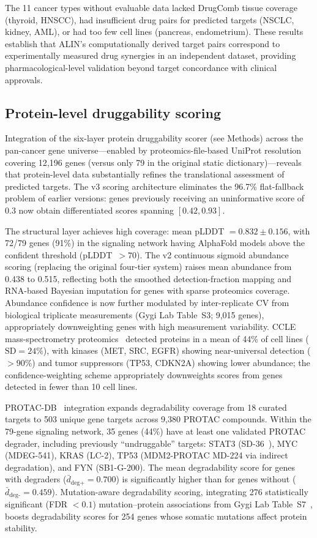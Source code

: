 \documentclass[times, twoside, watermark]{zHenriquesLab-StyleBioRxiv}
\begin{document}
The 11 cancer types without evaluable data lacked DrugComb tissue coverage (thyroid, HNSCC), had insufficient drug pairs for predicted targets (NSCLC, kidney, AML), or had too few cell lines (pancreas, endometrium). These results establish that ALIN's computationally derived target pairs correspond to experimentally measured drug synergies in an independent dataset, providing pharmacological-level validation beyond target concordance with clinical approvals.

\subsection*{Protein-level druggability scoring}
Integration of the six-layer protein druggability scorer (see Methods) across the pan-cancer gene universe---enabled by proteomics-file-based UniProt resolution covering 12{,}196 genes (versus only 79 in the original static dictionary)---reveals that protein-level data substantially refines the translational assessment of predicted targets. The v3 scoring architecture eliminates the 96.7\% flat-fallback problem of earlier versions: genes previously receiving an uninformative score of 0.3 now obtain differentiated scores spanning $[0.42, 0.93]$.

The structural layer achieves high coverage: mean pLDDT $= 0.832 \pm 0.156$, with 72/79 genes (91\%) in the signaling network having AlphaFold models above the confident threshold (pLDDT~$> 70$). The v2 continuous sigmoid abundance scoring (replacing the original four-tier system) raises mean abundance from 0.438 to 0.515, reflecting both the smoothed detection-fraction mapping and RNA-based Bayesian imputation for genes with sparse proteomics coverage. Abundance confidence is now further modulated by inter-replicate CV from biological triplicate measurements (Gygi Lab Table~S3; 9{,}015 genes), appropriately downweighting genes with high measurement variability. CCLE mass-spectrometry proteomics~\cite{Nusinow2020} detected proteins in a mean of 44\% of cell lines ($\text{SD} = 24\%$), with kinases (MET, SRC, EGFR) showing near-universal detection ($> 90\%$) and tumor suppressors (TP53, CDKN2A) showing lower abundance; the confidence-weighting scheme appropriately downweights scores from genes detected in fewer than 10 cell lines.

PROTAC-DB~\cite{Weng2021} integration expands degradability coverage from 18 curated targets to 503 unique gene targets across 9{,}380 PROTAC compounds. Within the 79-gene signaling network, 35 genes (44\%) have at least one validated PROTAC degrader, including previously ``undruggable'' targets: STAT3 (SD-36~\cite{Bai2019}), MYC (MDEG-541), KRAS (LC-2), TP53 (MDM2-PROTAC MD-224 via indirect degradation), and FYN (SB1-G-200). The mean degradability score for genes with degraders ($\bar{d}_{\text{deg+}} = 0.700$) is significantly higher than for genes without ($\bar{d}_{\text{deg-}} = 0.459$). Mutation-aware degradability scoring, integrating 276 statistically significant (FDR $< 0.1$) mutation--protein associations from Gygi Lab Table~S7~\cite{Nusinow2020}, boosts degradability scores for 254 genes whose somatic mutations affect protein stability.
\end{document}
